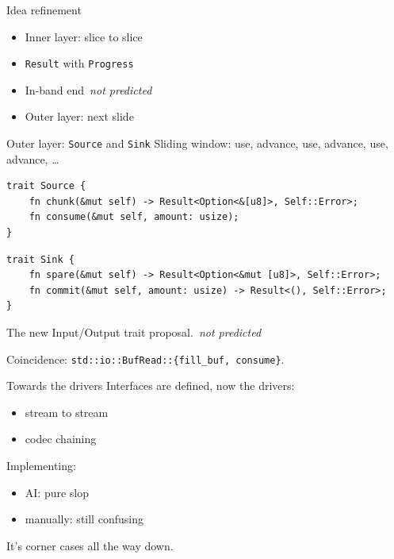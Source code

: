 \documentclass[aspectratio=169,11pt]{beamer}
\newcommand{\notetag}[1]{~\colorbox{orange!25}{\small\textit{#1}}}
\begin{document}
\begin{frame}{Idea refinement}
\begin{itemize}
\item Inner layer: slice to slice
\item \texttt{Result} with \texttt{Progress}
\item In-band end\notetag{not predicted}
\item Outer layer: next slide
\end{itemize}
\end{frame}

\begin{frame}[fragile]{Outer layer: \texttt{Source} and \texttt{Sink}}
Sliding window: use, advance, use, advance, use, advance, \dots

\smallskip
\begin{Verbatim}[fontsize=\small,frame=single]
trait Source {
    fn chunk(&mut self) -> Result<Option<&[u8]>, Self::Error>;
    fn consume(&mut self, amount: usize);
}
\end{Verbatim}

\smallskip
\begin{Verbatim}[fontsize=\small,frame=single]
trait Sink {
    fn spare(&mut self) -> Result<Option<&mut [u8]>, Self::Error>;
    fn commit(&mut self, amount: usize) -> Result<(), Self::Error>;
}
\end{Verbatim}

\smallskip
The new Input/Output trait proposal.\notetag{not predicted}

\smallskip
Coincidence: \texttt{std::io::BufRead::\{fill\_buf, consume\}}.
\end{frame}

\begin{frame}{Towards the drivers}
Interfaces are defined, now the drivers:
\begin{itemize}
\item stream to stream
\item codec chaining
\end{itemize}

\medskip
Implementing:
\begin{itemize}
\item AI: pure slop
\item manually: still confusing
\end{itemize}

\medskip
It's corner cases all the way down.
\end{frame}
\end{document}

